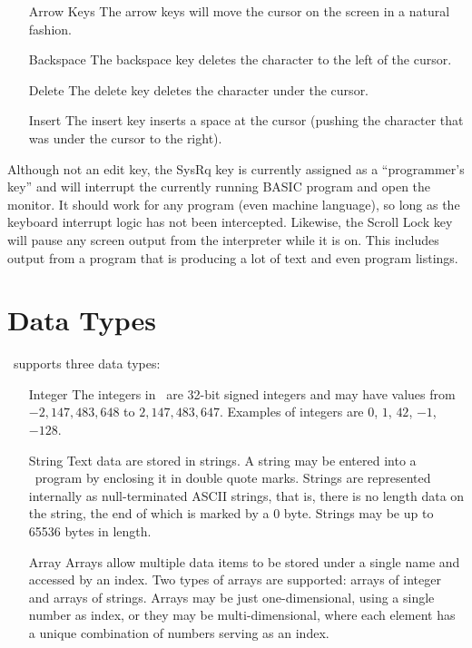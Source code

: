 \documentclass{report}
\begin{document}
    \begin{itemize}
        \item[Arrow Keys] The arrow keys will move the cursor on the screen in a natural fashion.
        \item[Backspace] The backspace key deletes the character to the left of the cursor.
        \item[Delete] The delete key deletes the character under the cursor.
        \item[Insert] The insert key inserts a space at the cursor (pushing the character that was under the cursor to the right).    
    \end{itemize}

    Although not an edit key, the SysRq key is currently assigned as a ``programmer's key'' and will interrupt
    the currently running BASIC program and open the monitor. It should work for any program (even machine language), so
    long as the keyboard interrupt logic has not been intercepted. Likewise, the Scroll Lock key will pause any screen
    output from the interpreter while it is on. This includes output from a program that is producing a lot of text and
    even program listings.

    \section*{Data Types}

    \BASIC\ supports three data types:

    \begin{itemize}
        \item[Integer]  The integers in \BASIC\ are 32-bit signed integers and may have values from $-2,147,483,648$ to $2,147,483,647$.
                        Examples of integers are $0$, $1$, $42$, $-1$, $-128$.

        \item[String]   Text data are stored in strings. A string may be entered into a \BASIC\ program by enclosing it in double quote marks.
                        Strings are represented internally as null-terminated ASCII strings, that is, there is no length data on the string,
                        the end of which is marked by a 0 byte.
                        Strings may be up to 65536 bytes in length.
                        
        \item[Array]    Arrays allow multiple data items to be stored under a single name and accessed by an index.
                        Two types of arrays are supported: arrays of integer and arrays of strings.
                        Arrays may be just one-dimensional, using a single number as index, or they may be multi-dimensional,
                        where each element has a unique combination of numbers serving as an index.
    \end{itemize}
\end{document}
